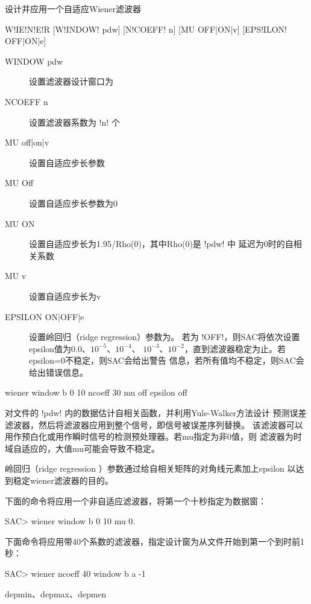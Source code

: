 \label{cmd:wiener}

设计并应用一个自适应Wiener滤波器

\begin{SACSTX}
W!IE!N!E!R [W!INDOW! pdw] [N!COEFF! n] [MU OFF|ON|v] [EPS!ILON! OFF|ON|e]
\end{SACSTX}

\begin{description}
\item [WINDOW pdw] 设置滤波器设计窗口为 
\item [NCOEFF n] 设置滤波器系数为 !n! 个
\item [MU off|on|v] 设置自适应步长参数
\item [MU Off] 设置自适应步长参数为0
\item [MU ON] 设置自适应步长为1.95/Rho(0)，其中Rho(0)是 !pdw! 中
    延迟为0时的自相关系数
\item [MU v] 设置自适应步长为v
\item [EPSILON ON|OFF|e] 设置岭回归（ridge regression）参数为。
    若为 !OFF!，则SAC将依次设置epsilon值为0.0、$10^{-5}$、$10^{-4}$、
    $10^{-3}$、$10^{-2}$，直到滤波器稳定为止。若epsilon=0不稳定，则SAC会给出警告
    信息，若所有值均不稳定，则SAC会给出错误信息。
\end{description}

\begin{SACDFT}
wiener window b 0 10 ncoeff 30 mu off epsilon off
\end{SACDFT}

对文件的 !pdw! 内的数据估计自相关函数，并利用Yule-Walker方法设计
预测误差滤波器，然后将滤波器应用到整个信号，即信号被误差序列替换。
该滤波器可以用作预白化或用作瞬时信号的检测预处理器。若mu指定为非0值，则
滤波器为时域自适应的，大值mu可能会导致不稳定。

岭回归（ridge regression ）参数通过给自相关矩阵的对角线元素加上epsilon
以达到稳定wiener滤波器的目的。

下面的命令将应用一个非自适应滤波器，将第一个十秒指定为数据窗：
\begin{SACCode}
SAC> wiener window b 0 10 mu 0.
\end{SACCode}

下面命令将应用带40个系数的滤波器，指定设计窗为从文件开始到第一个到时前1秒：
\begin{SACCode}
SAC> wiener ncoeff 40 window b a -1
\end{SACCode}

depmin、depmax、depmen
